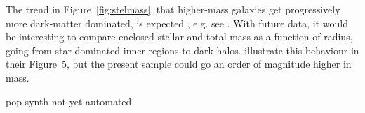 The trend in Figure~\ref{fig:stelmass}, that higher-mass galaxies get
progressively more dark-matter dominated, is expected
, e.g. see \cite{2005ApJ...623L...5F}.
With future data, it would be interesting to compare enclosed
stellar and total mass as a function of radius, going from
star-dominated inner regions to dark halos.
\cite{2011ApJ...740...97L} illustrate this behaviour in their
Figure~5, but the present sample could go an order of magnitude higher
in mass.


pop synth not yet automated
